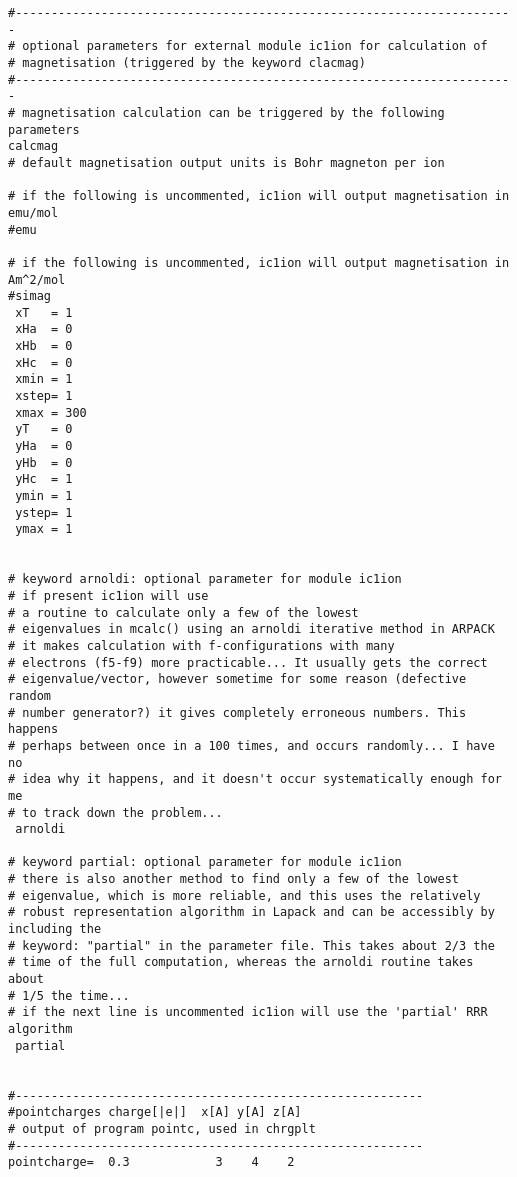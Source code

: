 \begin{verbatim}
#----------------------------------------------------------------------
# optional parameters for external module ic1ion for calculation of 
# magnetisation (triggered by the keyword clacmag)
#----------------------------------------------------------------------
# magnetisation calculation can be triggered by the following parameters
calcmag
# default magnetisation output units is Bohr magneton per ion

# if the following is uncommented, ic1ion will output magnetisation in emu/mol
#emu

# if the following is uncommented, ic1ion will output magnetisation in Am^2/mol
#simag
 xT   = 1
 xHa  = 0
 xHb  = 0
 xHc  = 0
 xmin = 1
 xstep= 1
 xmax = 300
 yT   = 0
 yHa  = 0
 yHb  = 0
 yHc  = 1
 ymin = 1
 ystep= 1
 ymax = 1


# keyword arnoldi: optional parameter for module ic1ion
# if present ic1ion will use 
# a routine to calculate only a few of the lowest
# eigenvalues in mcalc() using an arnoldi iterative method in ARPACK
# it makes calculation with f-configurations with many
# electrons (f5-f9) more practicable... It usually gets the correct
# eigenvalue/vector, however sometime for some reason (defective random
# number generator?) it gives completely erroneous numbers. This happens
# perhaps between once in a 100 times, and occurs randomly... I have no
# idea why it happens, and it doesn't occur systematically enough for me
# to track down the problem...
 arnoldi

# keyword partial: optional parameter for module ic1ion
# there is also another method to find only a few of the lowest
# eigenvalue, which is more reliable, and this uses the relatively
# robust representation algorithm in Lapack and can be accessibly by including the
# keyword: "partial" in the parameter file. This takes about 2/3 the
# time of the full computation, whereas the arnoldi routine takes about
# 1/5 the time...
# if the next line is uncommented ic1ion will use the 'partial' RRR algorithm 
 partial


#---------------------------------------------------------
#pointcharges charge[|e|]  x[A] y[A] z[A]
# output of program pointc, used in chrgplt
#---------------------------------------------------------
pointcharge=  0.3            3    4    2


\end{verbatim}
